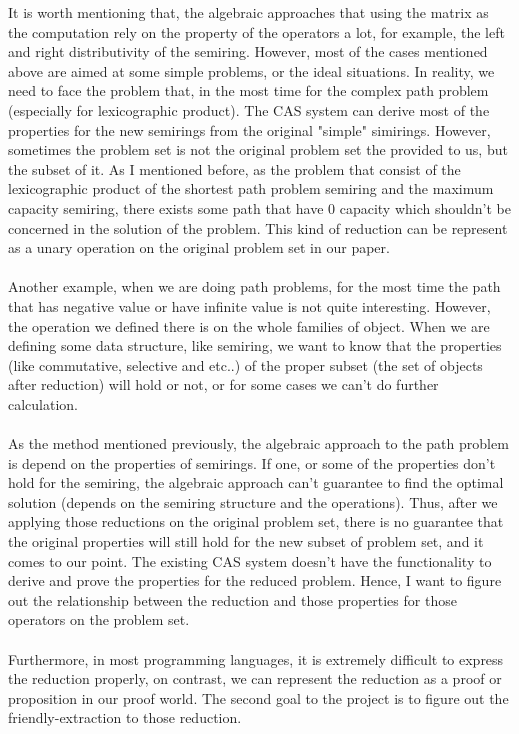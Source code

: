 \documentclass[a4paper,12pt,twoside,openright]{report}
\begin{document}
It is worth mentioning that, the algebraic approaches that using the matrix as the computation rely on the property of the operators a lot, for example, the left and right distributivity of the semiring.
However, most of the cases mentioned above are aimed at some simple problems, or the ideal situations. 
In reality, we need to face the problem that, in the most time for the complex path problem (especially for lexicographic product). 
The CAS system can derive most of the properties for the new semirings from the original "simple" simirings. 
However, sometimes the problem set is not the original problem set the provided to us, but the subset of it. As I mentioned before, as the problem that consist of the lexicographic product of the shortest path problem semiring and the maximum capacity semiring, there exists some path that have 0 capacity which shouldn't be concerned in the solution of the problem. This kind of reduction can be represent as a unary operation on the original problem set in our paper.\\\\
Another example, when we are doing path problems, for the most time the path that has negative value or have infinite value is not quite interesting. However, the operation we defined there is on the whole families of object. When we are defining some data structure, like semiring, we want to know that the properties (like commutative, selective and etc..) of the proper subset (the set of objects after reduction) will hold or not, or for some cases we can't do further calculation.\\\\
As the method mentioned previously, the algebraic approach to the path problem is depend on the properties of semirings. If one, or some of the properties don't hold for the semiring, the algebraic approach can't guarantee to find the optimal solution (depends on the semiring structure and the operations). Thus, after we applying those reductions on the original problem set, there is no guarantee that the original properties will still hold for the new subset of problem set, and it comes to our point. The existing CAS system doesn't have the functionality to derive and prove the properties for the reduced problem. Hence, I want to figure out the relationship between the reduction and those properties for those operators on the problem set.\\\\
Furthermore, in most programming languages, it is extremely difficult to express the reduction properly, on contrast, we can represent the reduction as a proof or proposition in our proof world. The second goal to the project is to figure out the friendly-extraction to those reduction. 
\end{document}
